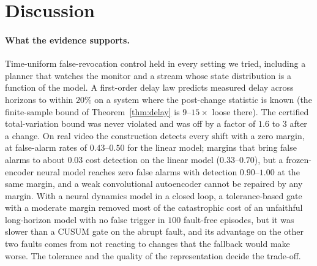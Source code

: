 \section{Discussion}\label{sec:discussion}

\paragraph{What the evidence supports.} Time-uniform false-revocation control held in every setting we tried, including a planner that watches the monitor and a stream whose state distribution is a function of the model. A first-order delay law predicts measured delay across horizons to within $20\%$ on a system where the post-change statistic is known (the finite-sample bound of Theorem~\ref{thm:delay} is $9$--$15\times$ loose there). The certified total-variation bound was never violated and was off by a factor of $1.6$ to $3$ after a change. On
real video the construction detects every shift with a zero margin, at false-alarm rates of $0.43$--$0.50$ for the linear model; margins that bring false alarms to about $0.03$ cost detection on the linear model ($0.33$--$0.70$), but a frozen-encoder neural model reaches zero false alarms with detection $0.90$--$1.00$ at the same margin, and a weak convolutional autoencoder cannot be repaired by any margin. With a neural dynamics model in a closed loop, a tolerance-based gate with a moderate margin removed most of the catastrophic cost of an unfaithful long-horizon model with no false trigger in $100$ fault-free episodes, but it was slower than a CUSUM gate on the abrupt fault, and its advantage on the other two faults comes from not reacting to changes that the fallback would make worse. The tolerance and the quality of the representation decide the trade-off.

